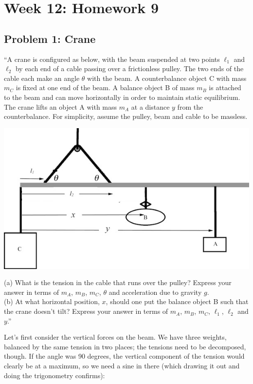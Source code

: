 \documentclass[8.01x]{subfiles}
\begin{document}
\chapter{Week 12: Homework 9}

\section{Problem 1: Crane}

``A crane is configured as below, with the beam suspended at two points $\ell_1$ and $\ell_2$ by each end of a cable passing over a frictionless pulley. The two ends of the cable each make an angle $\theta$ with the beam. A counterbalance object C with mass $m_C$ is fixed at one end of the beam. A balance object B of mass $m_B$ is attached to the beam and can move horizontally in order to maintain static equilibrium. The crane lifts an object A with mass $m_A$ at a distance $y$ from the counterbalance. For simplicity, assume the pulley, beam and cable to be massless.

\begin{center}
\includegraphics[scale=2.5]{Graphics/h9p1} %
\end{center}

(a) What is the tension in the cable that runs over the pulley? Express your answer in terms of $m_A$, $m_B$, $m_C$, $\theta$ and acceleration due to gravity $g$.\\
(b) At what horizontal position, $x$, should one put the balance object B such that the crane doesn't tilt? Express your answer in terms of $m_A$, $m_B$, $m_C$, $\ell_1$, $\ell_2$ and $y$.''

Let's first consider the vertical forces on the beam. We have three weights, balanced by the same tension in two places; the tensions need to be decomposed, though. If the angle was 90 degrees, the vertical component of the tension would clearly be at a maximum, so we need a sine in there (which drawing it out and doing the trigonometry confirms):
\end{document}
